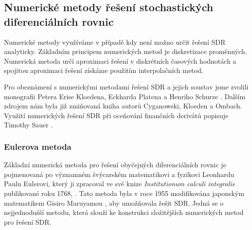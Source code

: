 \documentclass[a4paper,12pt]{report}
\theoremstyle{definition} \newtheorem{definice}[veta]{Definice}
\theoremstyle{remark}
\begin{document}
\subsection{Numerické metody řešení stochastických diferenciálních rovnic}
Numerické metody využíváme v případě kdy není možno určit řešení SDR analyticky.
Základním principem numerických metod je diskretizace proměnných.
Numerická metoda určí aproximaci řešení v diskrétních časových hodnotách a spojitou aproximaci řešení získáme použitím interpolačních metod.

Pro obeznámení s numerickými metodami řešení SDR a jejich soustav jsme zvolili monografii Petera Erise Kloedena, Eckharda Platena a Henriho Schurze \cite{kloeden1997}.
Dalším zdrojem nám byla již zmiňovaná kniha \cite{cyganowski2002elementary} autorů Cyganowski, Kloeden a Ombach.
Využití numerických řešení SDR při oceňování finančních derivátů popisuje Timothy Sauer \cite{sauer2012numerical}.

\subsubsection{Eulerova metoda}
Základní numerická metoda pro řešení obyčejných diferenciálních rovnic je pojmenovaná po významném švýcarském matematikovi a fyzikovi Leonhardu Paulu Eulerovi, který ji zpracoval ve své knize \textit{Institutionum calculi integralis} publikované roku 1768, \cite{euler1768institutionum}.
Tato metoda byla v roce 1955 modifikována japonským matematikem Gisiro Maruyamou \cite{maruyama1955continuous}, aby umožňovala řešit SDR.
Jedná se o nejjednodušší metodu, která slouží ke konstrukci složitějších numerických metod pro řešení SDR.
\end{document}
